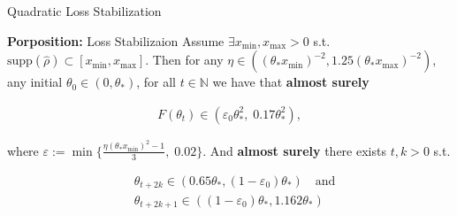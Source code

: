 \documentclass[fleqn]{beamer}
\begin{document}
    \begin{frame}{Quadratic Loss Stabilization}
        \begin{block}{\textbf{Porposition:} Loss Stabilizaion}
            Assume $\exists x_{\text{min}}, x_{\text{max}} > 0$ s.t.
            $\text{supp}(\hat{\rho}) \subset [x_\text{min}, x_\text{max}]$.
            Then for any $\eta \in \left( (\theta_* x_\text{min})^{-2}, 1.25
            (\theta_*x_\text{max})^{-2}\right)$, any initial $\theta_{0} \in
            (0, \theta_*)$, for all $t \in \mathbb{N}$ we have that
            \textbf{almost surely}
            \begin{center}
            \begin{minipage}{0.5\textwidth}
            \begin{align*}
                F(\theta_t) \in \left(\varepsilon_0 \theta_*^{2},\; 0.17
                \theta_*^{2}\right),
            \end{align*}
            \end{minipage}
            \end{center}
        where $\varepsilon := \min
        \{\frac{\eta(\theta_*x_\text{min})^{2}-1}{3},\; 0.02\}$.
        \newline
        And \textbf{almost surely} there exists $t, k >0$ s.t.
        \begin{center}
        \begin{minipage}{0.5\textwidth}
        \begin{align*}
            &\theta_{t+2k} \in (0.65\theta_*, (1-\varepsilon_0)\theta_*) \quad
            \text{and}\\
            &\theta_{t+2k+1} \in ((1-\varepsilon_0)\theta_*, 1.162\theta_*)
        \end{align*}
        \end{minipage}
        \end{center}
        \end{block}
    \end{frame}
\end{document}
